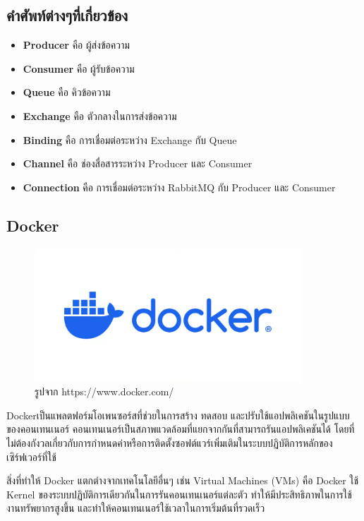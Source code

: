   \subsection{คำศัพท์ต่างๆที่เกี่ยวข้อง}
  \begin{itemize}
    \item \textbf{Producer} คือ ผู้ส่งข้อความ
    \item \textbf{Consumer} คือ ผู้รับข้อความ
    \item \textbf{Queue} คือ คิวข้อความ
    \item \textbf{Exchange} คือ ตัวกลางในการส่งข้อความ
    \item \textbf{Binding} คือ การเชื่อมต่อระหว่าง Exchange กับ Queue
    \item \textbf{Channel} คือ ช่องสื่อสารระหว่าง Producer และ Consumer
    \item \textbf{Connection} คือ การเชื่อมต่อระหว่าง RabbitMQ กับ Producer และ Consumer
  \end{itemize}
\subsection{Docker}
\begin{figure}[H]
  \centering
  \includegraphics[width=100mm, keepaspectratio ]{pictures/docker.png}
  \caption[Poem]{รูปจาก https://www.docker.com/}
  \label{fig:docker}
\end{figure}

\hspace{1.27cm}Docker\cite{Docker}เป็นแพลตฟอร์มโอเพนซอร์สที่ช่วยในการสร้าง ทดสอบ และปรับใช้แอปพลิเคชันในรูปแบบของคอนเทนเนอร์ คอนเทนเนอร์เป็นสภาพแวดล้อมที่แยกจากกันที่สามารถรันแอปพลิเคชันได้ โดยที่ไม่ต้องกังวลเกี่ยวกับการกำหนดค่าหรือการติดตั้งซอฟต์แวร์เพิ่มเติมในระบบปฏิบัติการหลักของเซิร์ฟเวอร์ที่ใช้

\hspace{0.8cm}สิ่งที่ทำให้ Docker แตกต่างจากเทคโนโลยีอื่นๆ เช่น Virtual Machines (VMs) คือ Docker ใช้ Kernel ของระบบปฏิบัติการเดียวกันในการรันคอนเทนเนอร์แต่ละตัว ทำให้มีประสิทธิภาพในการใช้งานทรัพยากรสูงขึ้น และทำให้คอนเทนเนอร์ใช้เวลาในการเริ่มต้นที่รวดเร็ว

